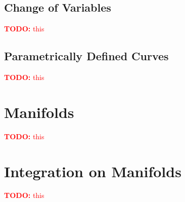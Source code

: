 \documentclass{article}
\newcommand{\TODO}[1]{\textcolor{red}{\textbf{TODO:} #1}}
\begin{document}
\subsection{Change of Variables}

\TODO{this}

\subsection{Parametrically Defined Curves}

\TODO{this}

\section{Manifolds}

\TODO{this}

\section{Integration on Manifolds}

\TODO{this}
\end{document}
